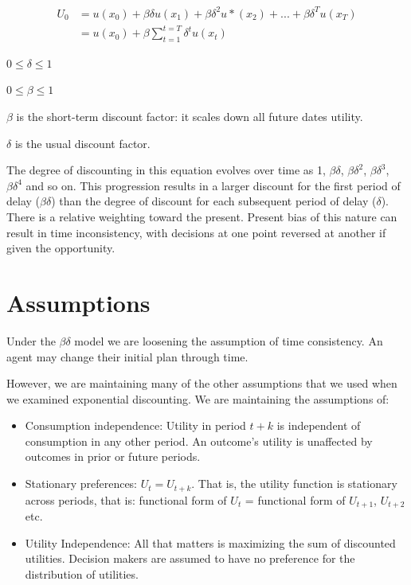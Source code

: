 \documentclass[
  letterpaper,
  DIV=11,
  numbers=noendperiod]{scrreprt}
\begin{document}
\begin{align*}
U_0&=u(x_0)+\beta \delta u(x_1)+\beta \delta^2 u*(x_2)+ ... + \beta \delta^T u(x_T) \\
&=u(x_0)+\beta \sum_{t=1}^{t=T}\delta^t u(x_t)
\end{align*}

\(0\leq \delta \leq 1\)

\(0\leq \beta \leq 1\)

\(\beta\) is the short-term discount factor: it scales down all future
dates utility.

\(\delta\) is the usual discount factor.

The degree of discounting in this equation evolves over time as 1,
\(\beta\delta\), \(\beta\delta^2\), \(\beta\delta^3\), \(\beta\delta^4\)
and so on. This progression results in a larger discount for the first
period of delay (\(\beta\delta\)) than the degree of discount for each
subsequent period of delay (\(\delta\)). There is a relative weighting
toward the present. Present bias of this nature can result in time
inconsistency, with decisions at one point reversed at another if given
the opportunity.

\hypertarget{assumptions}{%
\section{Assumptions}\label{assumptions}}

Under the \(\beta\delta\) model we are loosening the assumption of time
consistency. An agent may change their initial plan through time.

However, we are maintaining many of the other assumptions that we used
when we examined exponential discounting. We are maintaining the
assumptions of:

\begin{itemize}
\item
  Consumption independence: Utility in period \(t+k\) is independent of
  consumption in any other period. An outcome's utility is unaffected by
  outcomes in prior or future periods.
\item
  Stationary preferences: \(U_t=U_{t+k}\). That is, the utility function
  is stationary across periods, that is: functional form of \(U_t\) =
  functional form of \(U_{t+1}\), \(U_{t+2}\) etc.
\item
  Utility Independence: All that matters is maximizing the sum of
  discounted utilities. Decision makers are assumed to have no
  preference for the distribution of utilities.
\end{itemize}
\end{document}

